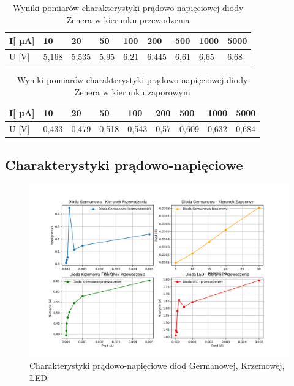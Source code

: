 \documentclass[10.5pt]{article}
\begin{document}
\begin{table}[!ht]
    \centering
    \caption{Wyniki pomiarów charakterystyki prądowo-napięciowej diody Zenera w kierunku przewodzenia}
    \begin{tabular}{|l|l|l|l|l|l|l|l|l|}
    \hline
        I[ µA] & 10 & 20 & 50 & 100 & 200 & 500 & 1000 & 5000 \\ \hline
        U [V] & 5,168 & 5,535 & 5,95 & 6,21 & 6,445 & 6,61 & 6,65 & 6,68 \\ \hline
    \end{tabular}
\end{table}
\begin{table}[!ht]
    \centering
    \caption{Wyniki pomiarów charakterystyki prądowo-napięciowej diody Zenera w kierunku zaporowym}
    \begin{tabular}{|l|l|l|l|l|l|l|l|l|}
    \hline
        I[ µA] & 10 & 20 & 50 & 100 & 200 & 500 & 1000 & 5000 \\ \hline
        U [V] & 0,433 & 0,479 & 0,518 & 0,543 & 0,57 & 0,609 & 0,632 & 0,684 \\ \hline
    \end{tabular}
\end{table}
\clearpage
\subsection*{Charakterystyki prądowo-napięciowe}

\begin{figure}[H]
    \centering
    \includegraphics[width=1.0\textwidth]{Figure_1.png}
    \caption{Charakterystyki prądowo-napięciowe diod Germanowej, Krzemowej, LED}
    \label{fig:charakterystyki_przewodzenie}
\end{figure}
\end{document}
